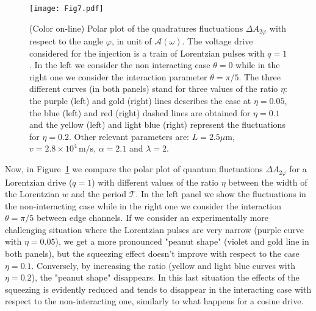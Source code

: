 \documentclass[12pt]{iopart}
\begin{document}
\begin{figure}[ht]
\centering
\texttt{[image: Fig7.pdf]}
\caption{(Color on-line) Polar plot of the quadratures fluctuations $\Delta A_{2\varphi}$ with respect to the angle $\varphi$, in unit of $\mathcal{A}(\omega)$. The voltage drive considered for the injection is a train of Lorentzian pulses with $q=1$. In the left we consider the non interacting case $\theta=0$ while in the right one we consider the interaction parameter $\theta=\pi/5$. The three different curves (in both panels) stand for three values of the ratio $\eta$: the purple (left) and gold (right) lines describes the case at $\eta=0.05$, the blue (left) and red (right) dashed lines are obtained for $\eta=0.1$ and the yellow (left) and light blue (right) represent the fluctuations for $\eta=0.2$. Other relevant parameters are: $L=2.5 \mu\mathrm{m}$, $v=2.8\times 10^4\, \mathrm{m/s}$, $\alpha=2.1$ and $\lambda=2$.} 
\label{Fig7}
\end{figure} 
Now, in Figure~\ref{Fig7} we compare the polar plot of quantum  fluctuations $\Delta A_{2\varphi}$ for a Lorentzian drive ($q=1$) with different values of the ratio $\eta$ between the width of the Lorentzian $w$ and the period $\mathcal{T}$. In the left panel we show the fluctuations in the non-interacting case while in the right one we consider the interaction $\theta=\pi/5$ between edge channels. If we consider an experimentally more challenging situation where the Lorentzian pulses are very narrow (purple curve with $\eta=0.05$), we get a more pronounced "peanut shape" (violet and gold line in both panels), but the squeezing effect doesn't improve with respect to the case $\eta=0.1$. Conversely, by increasing the ratio (yellow and light blue curves with $\eta=0.2$), the "peanut shape" disappears. In this last situation the effects of the squeezing is evidently reduced and tends to disappear in the interacting case with respect to the non-interacting one, similarly to what happens for a cosine drive.
\end{document}
